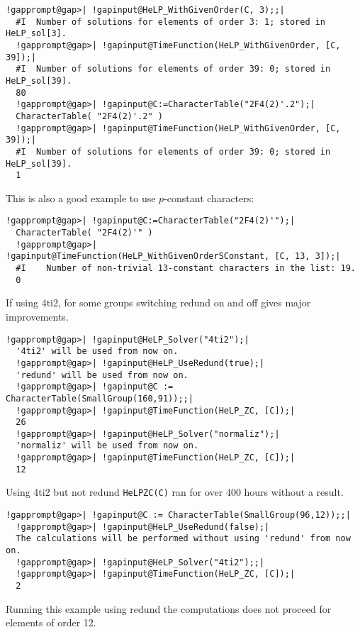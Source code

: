 \documentclass[a4paper,11pt]{report}
\begin{document}
{{\begin{Verbatim}[commandchars=!@|,fontsize=\small,frame=single,label=Example]
  !gapprompt@gap>| !gapinput@HeLP_WithGivenOrder(C, 3);;|
  #I  Number of solutions for elements of order 3: 1; stored in HeLP_sol[3].
  !gapprompt@gap>| !gapinput@TimeFunction(HeLP_WithGivenOrder, [C, 39]);|
  #I  Number of solutions for elements of order 39: 0; stored in HeLP_sol[39].
  80
  !gapprompt@gap>| !gapinput@C:=CharacterTable("2F4(2)'.2");|
  CharacterTable( "2F4(2)'.2" )
  !gapprompt@gap>| !gapinput@TimeFunction(HeLP_WithGivenOrder, [C, 39]);|
  #I  Number of solutions for elements of order 39: 0; stored in HeLP_sol[39].
  1
\end{Verbatim}
 This is also a good example to use $p$-constant characters: 
\begin{Verbatim}[commandchars=!@|,fontsize=\small,frame=single,label=Example]
  !gapprompt@gap>| !gapinput@C:=CharacterTable("2F4(2)'");|
  CharacterTable( "2F4(2)'" )
  !gapprompt@gap>| !gapinput@TimeFunction(HeLP_WithGivenOrderSConstant, [C, 13, 3]);|
  #I    Number of non-trivial 13-constant characters in the list: 19.           
  0
\end{Verbatim}
 If using 4ti2, for some groups switching redund on and off gives major
improvements. 
\begin{Verbatim}[commandchars=!@|,fontsize=\small,frame=single,label=Example]
  !gapprompt@gap>| !gapinput@HeLP_Solver("4ti2");|
  '4ti2' will be used from now on.
  !gapprompt@gap>| !gapinput@HeLP_UseRedund(true);|
  'redund' will be used from now on.
  !gapprompt@gap>| !gapinput@C := CharacterTable(SmallGroup(160,91));;|
  !gapprompt@gap>| !gapinput@TimeFunction(HeLP_ZC, [C]);|
  26
  !gapprompt@gap>| !gapinput@HeLP_Solver("normaliz");|
  'normaliz' will be used from now on.                                                                            
  !gapprompt@gap>| !gapinput@TimeFunction(HeLP_ZC, [C]);|
  12
\end{Verbatim}
 Using 4ti2 but not redund \texttt{HeLP{\textunderscore}ZC(C)} ran for over 400 hours without a result. 
\begin{Verbatim}[commandchars=!@|,fontsize=\small,frame=single,label=Example]
  !gapprompt@gap>| !gapinput@C := CharacterTable(SmallGroup(96,12));;|
  !gapprompt@gap>| !gapinput@HeLP_UseRedund(false);|
  The calculations will be performed without using 'redund' from now on.
  !gapprompt@gap>| !gapinput@HeLP_Solver("4ti2");;|
  !gapprompt@gap>| !gapinput@TimeFunction(HeLP_ZC, [C]);|
  2                                                                            
\end{Verbatim}
 Running this example using redund the computations does not proceed for
elements of order 12. }

}
\end{document}
